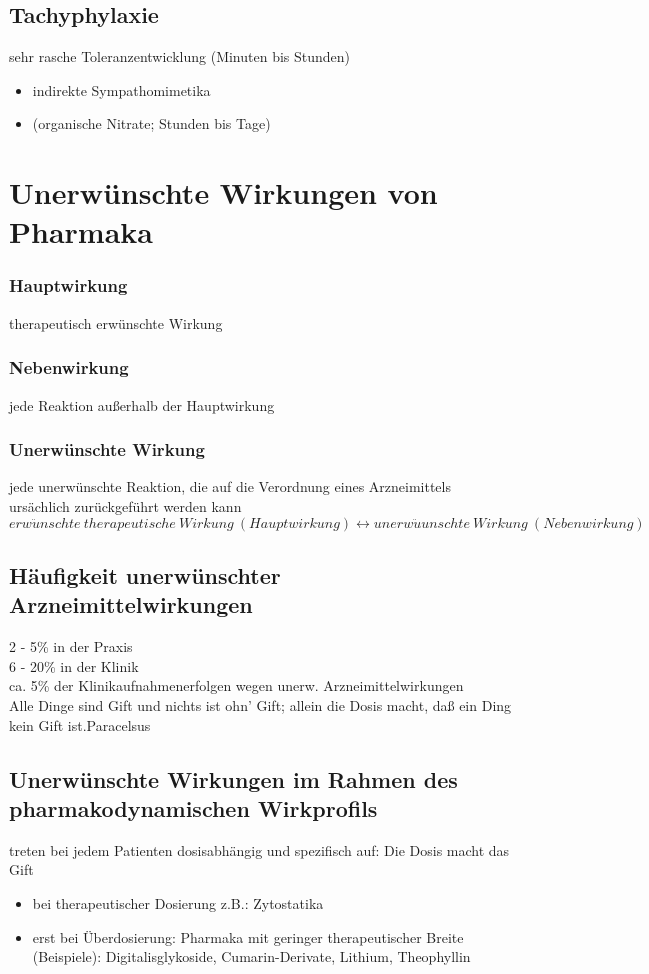 \documentclass[10pt,a4paper]{report}
\begin{document}
\subsection{Tachyphylaxie}
sehr rasche Toleranzentwicklung (Minuten bis Stunden)
\begin{itemize}
	\item indirekte Sympathomimetika
	\item (organische Nitrate; Stunden bis Tage)
\end{itemize}
\section{Unerwünschte Wirkungen von Pharmaka}
\subsubsection{Hauptwirkung} therapeutisch erwünschte Wirkung
\subsubsection{Nebenwirkung} jede Reaktion außerhalb der Hauptwirkung
\subsubsection{Unerwünschte Wirkung} jede unerwünschte Reaktion, die auf die Verordnung eines Arzneimittels ursächlich zurückgeführt werden kann
\begin{equation}
erw\ddot{u}nschte\:therapeutische\:Wirkung\:(Hauptwirkung) \longleftrightarrow  unerw\ddot{u}unschte\:Wirkung\:(Nebenwirkung)
\end{equation}

\subsection{Häufigkeit unerwünschter Arzneimittelwirkungen}
2 - 5\% in der Praxis 		\\
6 - 20\% in der Klinik\\
ca. 5\% der Klinikaufnahmenerfolgen wegen unerw. Arzneimittelwirkungen\\
\glqq Alle Dinge sind Gift und nichts ist ohn’ Gift; allein die Dosis macht, daß ein Ding kein Gift ist.Paracelsus\grqq
\subsection{Unerwünschte Wirkungen im Rahmen des
pharmakodynamischen Wirkprofils}
treten bei jedem Patienten dosisabhängig und spezifisch auf: \glqq Die Dosis macht das Gift\grqq
\begin{itemize}
	\item bei therapeutischer Dosierung   z.B.: Zytostatika
	\item erst bei Überdosierung: Pharmaka mit geringer therapeutischer Breite (Beispiele):	Digitalisglykoside, Cumarin-Derivate, Lithium, Theophyllin
\end{itemize}
\end{document}
